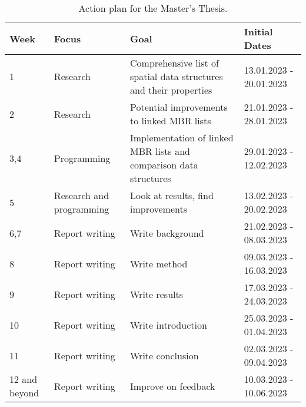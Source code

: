 \begin{table}
	\centering
	\caption{Action plan for the Master's Thesis.}
	\label{tab:plan}
	\begin{tabularx}{\textwidth}{|X|X|X|X|} \hline
		\multicolumn{1}{|X|}{\textbf{Week}} & \multicolumn{1}{X|}{\textbf{Focus}} & \multicolumn{1}{X|}{\textbf{Goal}} & \multicolumn{1}{X|}{\textbf{Initial Dates}}\\ \hline
		1 & Research & Comprehensive list of spatial data structures and their properties & 13.01.2023 - 20.01.2023 \\ \hline
		2 & Research & Potential improvements to linked MBR lists & 21.01.2023 - 28.01.2023 \\ \hline
		3,4 & Programming & Implementation of linked MBR lists and comparison data structures & 29.01.2023 - 12.02.2023 \\ \hline
		5 & Research and programming & Look at results, find improvements & 13.02.2023 - 20.02.2023 \\ \hline
		6,7 & Report writing & Write background & 21.02.2023 - 08.03.2023 \\ \hline
		8 & Report writing & Write method & 09.03.2023 - 16.03.2023 \\ \hline
		9 & Report writing & Write results & 17.03.2023 - 24.03.2023 \\ \hline
		10 & Report writing & Write introduction & 25.03.2023 - 01.04.2023 \\ \hline
		11 & Report writing & Write conclusion & 02.03.2023 - 09.04.2023 \\ \hline
		12 and beyond & Report writing & Improve on feedback & 10.03.2023 - 10.06.2023 \\ \hline
	\end{tabularx}
\end{table}
